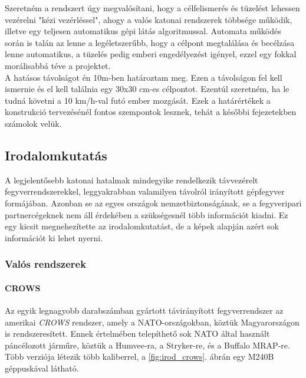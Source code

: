 \documentclass[12pt,a4paper]{article}
\begin{document}
Szeretném a rendszert úgy megvalósítani, hogy a célfelismerés és tüzelést lehessen vezérelni "kézi vezérléssel", ahogy a valós katonai rendszerek többsége működik, illetve egy teljesen automatikus gépi látás algoritmussal. Automata működés során is talán az lenne a legéletszerűbb, hogy a célpont megtalálása és becélzása lenne automatikus, a tüzelés pedig emberi engedélyezést igényel, ezzel egy fokkal morálisabbá téve a projektet.\\

A hatásos távolságot én 10m-ben határoztam meg. Ezen a távolságon fel kell ismernie és el kell találnia egy 30x30 cm-es célpontot. Ezentúl szeretném, ha le tudná követni a 10 km/h-val futó ember mozgását. Ezek a határértékek a konstrukció tervezésénél fontos szempontok lesznek, tehát a későbbi fejezetekben számolok velük.\\


\pagebreak


\subsection{Irodalomkutatás}
A legjelentősebb katonai hatalmak mindegyike rendelkezik távvezérelt fegyverrendszerekkel, leggyakrabban valamilyen távolról irányított gépfegyver formájában. Azonban se az egyes országok nemzetbiztonságának, se a fegyveripari partnercégeknek nem áll érdekében a szükségesnél több információt kiadni. Ez egy kicsit megnehezítette az irodalomkutatást, de a képek alapján azért sok információt ki lehet nyerni.

\subsubsection{Valós rendszerek} \label{sec:valos}

\paragraph{CROWS \cite{crows}}
Az egyik legnagyobb darabszámban gyártott távirányított fegyverrendszer az amerikai \textsl{CROWS} rendszer, amely a NATO-országokban, köztük Magyarországon is rendszeresített. Ennek értelmében telepíthető sok NATO által használt páncélozott járműre, köztük a Humvee-ra, a Stryker-re, és a Buffalo MRAP-re. Több verziója létezik több kaliberrel, a \ref{fig:irod_crows}. ábrán egy M240B géppuskával látható.\\
\end{document}
